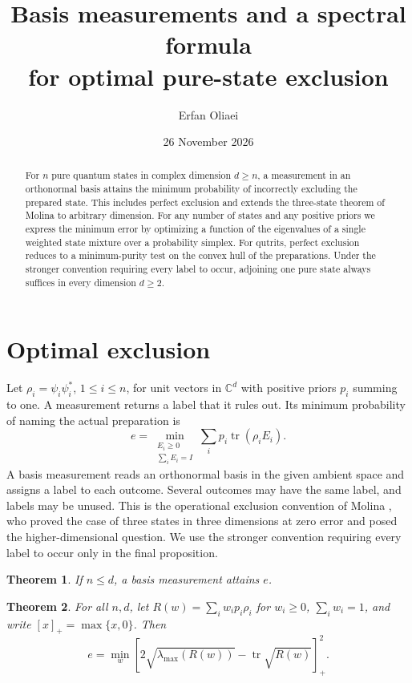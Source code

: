 \documentclass[11pt,a4paper]{article}
\title{Basis measurements and a spectral formula\protect\\ for optimal pure-state exclusion}
\author{Erfan Oliaei}
\date{26 November 2026}
\newtheorem{theorem}{Theorem}
\theoremstyle{remark}
\newcommand{\tr}{\operatorname{tr}}
\newcommand{\C}{\mathbb C}
\begin{document}
\maketitle
\begin{abstract}
For \(n\) pure quantum states in complex dimension \(d\ge n\), a measurement in an orthonormal basis attains the minimum probability of incorrectly excluding the prepared state. This includes perfect exclusion and extends the three-state theorem of Molina to arbitrary dimension. For any number of states and any positive priors we express the minimum error by optimizing a function of the eigenvalues of a single weighted state mixture over a probability simplex. For qutrits, perfect exclusion reduces to a minimum-purity test on the convex hull of the preparations. Under the stronger convention requiring every label to occur, adjoining one pure state always suffices in every dimension \(d\ge2\).
\end{abstract}

\section{Optimal exclusion}

Let \(\rho_i=\psi_i\psi_i^*\), \(1\le i\le n\), for unit vectors in \(\C^d\) with positive priors \(p_i\) summing to one. A measurement returns a label that it rules out. Its minimum probability of naming the actual preparation is
\begin{equation}\label{primal}
        e=\min_{\substack{E_i\ge0\\\sum_iE_i=I}}
                    \sum_i p_i\tr(\rho_iE_i).
\end{equation}
A basis measurement reads an orthonormal basis in the given ambient space and assigns a label to each outcome. Several outcomes may have the same label, and labels may be unused. This is the operational exclusion convention of Molina \cite{Molina}, who proved the case of three states in three dimensions at zero error and posed the higher-dimensional question. We use the stronger convention requiring every label to occur only in the final proposition.

\begin{theorem}\label{project}
If \(n\le d\), a basis measurement attains \(e\).
\end{theorem}

\begin{theorem}\label{formula}
For all \(n,d\), let \(R(w)=\sum_i w_ip_i\rho_i\) for \(w_i\ge0\), \(\sum_iw_i=1\), and write \([x]_+=\max\{x,0\}\). Then
\[
 e=\min_w \left[2\sqrt{\lambda_{\max}(R(w))}
                       -\tr\sqrt{R(w)}\right]_+^2.
\]
\end{theorem}
\end{document}
